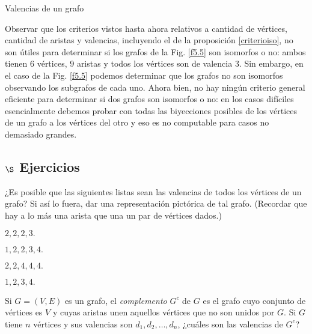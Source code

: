 \begin{section}{Valencias de un grafo}
\begin{ejemplo*}
Observar que los criterios vistos hasta ahora relativos a cantidad de vértices,  cantidad de aristas y valencias, incluyendo el de la proposición \ref{criterioiso}, no son útiles para determinar si los grafos de  la Fig. \ref{f5.5} son isomorfos o no: ambos tienen $6$ vértices, $9$ aristas y todos los vértices son de valencia $3$. Sin embargo, en el caso de la Fig. \ref{f5.5} podemos determinar que los grafos no son isomorfos observando los subgrafos de cada uno. Ahora bien, no  hay ningún criterio general eficiente para determinar si dos grafos son isomorfos o no: en los casos difíciles esencialmente debemos probar con todas las biyecciones posibles de los vértices de un grafo a los vértices del otro y eso es no computable para casos no demasiado  grandes.   
\end{ejemplo*}

\subsection*{$\S$ Ejercicios}\label{ejercicios5.3}
\begin{enumex}
\item ¿Es posible que las siguientes listas sean las valencias de todos los vértices de un grafo? Si así lo fuera, dar una representación pictórica de tal grafo. (Recordar que hay a lo más una arista que una un par de
vértices dados.)
    \begin{enumex}
        \begin{minipage}{0.4\textwidth}
            \item $2,2,2,3.$
        \end{minipage}
        \begin{minipage}{0.4\textwidth}
            \item $1,2,2,3,4.$
        \end{minipage}

        \begin{minipage}{0.4\textwidth}
            \item $2,2,4,4,4.$
        \end{minipage}
        \begin{minipage}{0.4\textwidth}
            \item $1,2,3,4.$
        \end{minipage}
    \end{enumex}


\item Si $G=(V,E)$ es un grafo, el \textit{complemento} $G^c$ de $G$ es el grafo cuyo conjunto de vértices es $V$ y cuyas aristas unen aquellos vértices que no son unidos por $G$. Si $G$ tiene $n$ vértices y sus valencias son $d_1,d_2,\ldots,d_n$, ¿cuáles son las valencias de $G^c$? 


\end{enumex}
\end{section}
